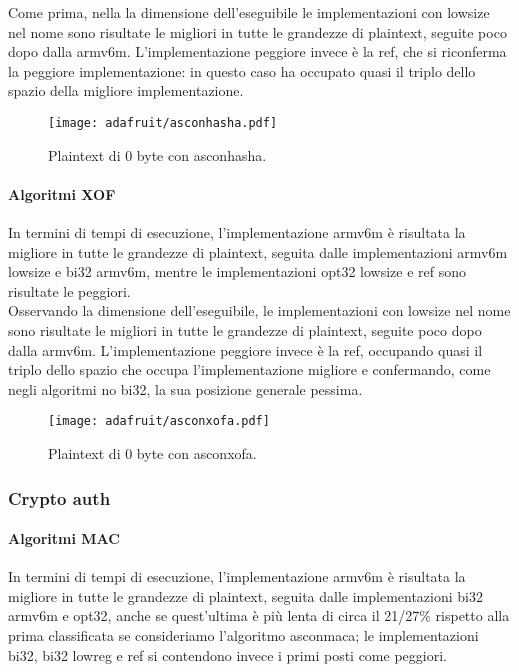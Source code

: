 \noindent Come prima, nella la dimensione dell'eseguibile le implementazioni con lowsize nel nome sono risultate le migliori in tutte le grandezze di plaintext, seguite poco dopo dalla armv6m. L'implementazione peggiore invece è la ref, che si riconferma la peggiore implementazione: in questo caso ha occupato quasi il triplo dello spazio della migliore implementazione.

\begin{figure}[H]
    \centering
    \texttt{[image: adafruit/asconhasha.pdf]}
    \caption{Plaintext di 0 byte con asconhasha.}
\end{figure}

\paragraph{Algoritmi XOF}

In termini di tempi di esecuzione, l'implementazione armv6m è risultata la migliore in tutte le grandezze di plaintext, seguita dalle implementazioni armv6m lowsize e bi32 armv6m, mentre le implementazioni opt32 lowsize e ref sono risultate le peggiori. \\

\noindent Osservando la dimensione dell'eseguibile, le implementazioni con lowsize nel nome sono risultate le migliori in tutte le grandezze di plaintext, seguite poco dopo dalla armv6m. L'implementazione peggiore invece è la ref, occupando quasi il triplo dello spazio che occupa l'implementazione migliore e confermando, come negli algoritmi no bi32, la sua posizione generale pessima.

\begin{figure}[H]
    \centering
    \texttt{[image: adafruit/asconxofa.pdf]}
    \caption{Plaintext di 0 byte con asconxofa.}
\end{figure}

\subsubsection{Crypto auth}

\paragraph{Algoritmi MAC}

In termini di tempi di esecuzione, l'implementazione armv6m è risultata la migliore in tutte le grandezze di plaintext, seguita dalle implementazioni bi32 armv6m e opt32, anche se quest'ultima è più lenta di circa il 21/27\% rispetto alla prima classificata se consideriamo l'algoritmo asconmaca; le implementazioni bi32, bi32 lowreg e ref si contendono invece i primi posti come peggiori. \\

